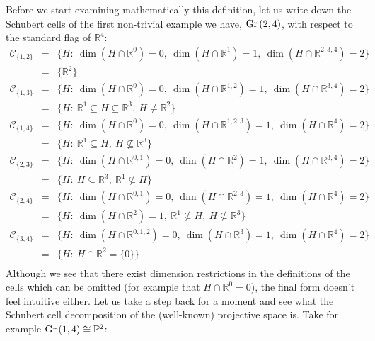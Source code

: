 Before we start examining mathematically this definition, let us write down the Schubert cells of the first non-trivial example we have, $\Gr{2}{4}$, with respect to the standard flag of $\mathbb{R}^4$:
\[\begin{array}{rcl}
\mathcal{C}_{\{1,2\}}&=&\big\{H:\ \dim(H\cap\mathbb{R}^{0})=0,\ \dim(H\cap\mathbb{R}^{1})=1,\ \dim(H\cap\mathbb{R}^{2,3,4})=2\big\}\\
&=&\big\{\mathbb{R}^2\big\}\\[.6em]
\mathcal{C}_{\{1,3\}}&=&\big\{H:\ \dim(H\cap\mathbb{R}^{0})=0,\ \dim(H\cap\mathbb{R}^{1,2})=1,\ \dim(H\cap\mathbb{R}^{3,4})=2\big\}\\
&=&\big\{H:\ \mathbb{R}^1\subseteq H\subseteq\mathbb{R}^3,\ H\neq\mathbb{R}^2\big\}\\[.6em]
\mathcal{C}_{\{1,4\}}&=&\big\{H:\ \dim(H\cap\mathbb{R}^{0})=0,\ \dim(H\cap\mathbb{R}^{1,2,3})=1,\ \dim(H\cap\mathbb{R}^{4})=2\big\}\\
&=&\big\{H:\ \mathbb{R}^1\subseteq H,\ H\not\subseteq\mathbb{R}^3\big\}\\[.6em]
\mathcal{C}_{\{2,3\}}&=&\big\{H:\ \dim(H\cap\mathbb{R}^{0,1})=0,\ \dim(H\cap\mathbb{R}^{2})=1,\ \dim(H\cap\mathbb{R}^{3,4})=2\big\}\\
&=&\big\{H:\ H\subseteq\mathbb{R}^3,\ \mathbb{R}^1\not\subseteq H\big\}\\[.6em]
\mathcal{C}_{\{2,4\}}&=&\big\{H:\ \dim(H\cap\mathbb{R}^{0,1})=0,\ \dim(H\cap\mathbb{R}^{2,3})=1,\ \dim(H\cap\mathbb{R}^{4})=2\big\}\\
&=&\big\{H:\ \dim(H\cap\mathbb{R}^2)=1,\ \mathbb{R}^1\not\subseteq H,\ H\not\subseteq\mathbb{R}^3\big\}\\[.6em]
\mathcal{C}_{\{3,4\}}&=&\big\{H:\ \dim(H\cap\mathbb{R}^{0,1,2})=0,\ \dim(H\cap\mathbb{R}^{3})=1,\ \dim(H\cap\mathbb{R}^{4})=2\big\}\\
&=&\big\{H:\ H\cap\mathbb{R}^2=\{0\}\big\}\\[.6em]
\end{array}\]
Although we see that there exist dimension restrictions in the definitions of the cells which can be omitted (for example that $H\cap\mathbb{R}^0=0$), the final form doesn't feel intuitive either. Let us take a step back for a moment and see what the Schubert cell decomposition of the (well-known) projective space is. Take for example $\Gr{1}{4}\cong\mathbb{P}^2$:
